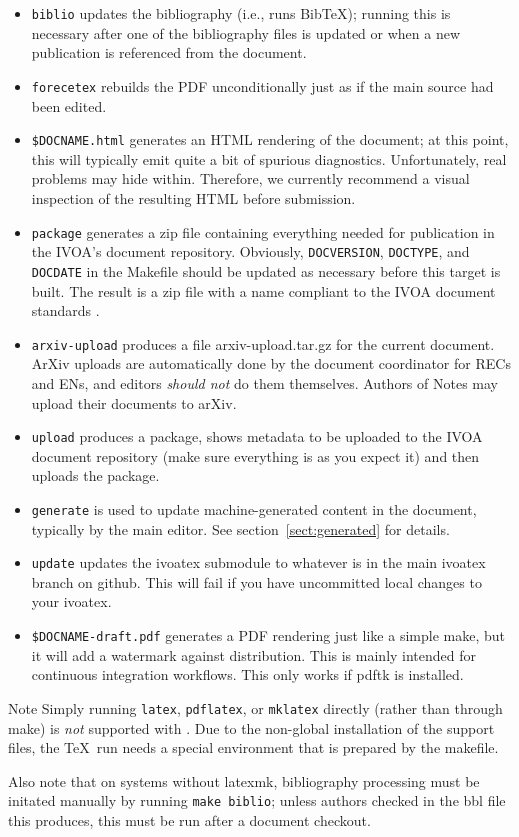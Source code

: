 \documentclass[11pt,a4paper]{ivoa}
\newcommand{\BibTeX}{BibTeX}
\begin{document}
\begin{itemize}
\item \texttt{biblio} updates the bibliography (i.e., runs \BibTeX);
running this is necessary after one of the bibliography files is updated
or when a new publication is referenced from the document.
\item \texttt{forecetex} rebuilds the PDF unconditionally just as if the
main source had been edited.
\item \texttt{\$DOCNAME.html} generates an HTML rendering of the
document; at this point, this will typically emit quite a bit of
spurious diagnostics.  Unfortunately, real problems may hide within.  
Therefore, we currently recommend a visual inspection of the resulting
HTML before submission.
\item \texttt{package} generates a zip file containing everything needed
for publication in the IVOA's document repository.   Obviously, 
\texttt{DOCVERSION}, \texttt{DOCTYPE}, and \texttt{DOCDATE} in the
Makefile should be updated as necessary before this target is built.
The result is a zip file with a name compliant to the IVOA document
standards \citep{2017ivoa.spec.0517D}.
\item \texttt{arxiv-upload}  produces a file arxiv-upload.tar.gz for
the current document.  ArXiv uploads are automatically done by the
document coordinator for RECs and ENs, and editors \emph{should not} do
them themselves.  Authors of Notes may upload their documents to arXiv.
\item \texttt{upload} produces a package, shows metadata to be uploaded to the
IVOA document repository (make sure everything is as you expect it) and
then uploads the package.
\item \texttt{generate} is used to update machine-generated content in
the document, typically by the main editor.  See
section~\ref{sect:generated} for details.
\item \texttt{update} updates the ivoatex submodule to whatever is in
the main ivoatex branch on github.  This will fail if you have
uncommitted local changes to your ivoatex.
\item \texttt{\$DOCNAME-draft.pdf} generates a PDF rendering just like a
simple make, but it will add a watermark against distribution.  This is
mainly intended for continuous integration workflows.  This only works
if pdftk is installed.
\end{itemize}

\begin{admonition}{Note}
Simply running \texttt{latex}, \texttt{pdflatex}, 
or \texttt{mklatex} directly
(rather than through make) is \emph{not} supported with \ivoatex.  Due
to the non-global installation of the support files, the \TeX\ run needs
a special environment that is prepared by the makefile.

Also note that on systems without latexmk,
bibliography processing must be initated manually by
running \texttt{make biblio}; unless authors checked in the bbl file
this produces, this must be run after a document checkout.
\end{admonition}
\end{document}
